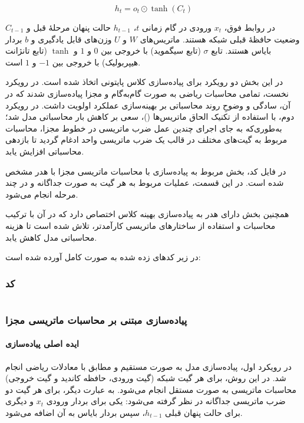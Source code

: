 \documentclass{article}
\begin{document}
\[
h_t = o_t \odot \tanh(C_t)
\]

در روابط فوق، $x_t$ ورودی در گام زمانی $t$، $h_{t-1}$ حالت پنهان مرحلۀ قبل و $C_{t-1}$ وضعیت حافظۀ قبلی شبکه هستند. ماتریس‌های $W$ و $U$ وزن‌های قابل یادگیری و $b$ بردار بایاس هستند. تابع $\sigma$ (تابع سیگموید) با خروجی بین $0$ و $1$ و $\tanh$ (تابع تانژانت هیپربولیک) با خروجی بین $-1$ و $1$ است.

در این بخش دو رویکرد برای پیاده‌سازی کلاس پایتونی اتخاذ شده است. در رویکرد نخست، تمامی محاسبات ریاضی به صورت گام‌به‌گام و مجزا پیاده‌سازی شدند که در آن، سادگی و وضوحِ روند محاسباتی بر بهینه‌سازی عملکرد اولویت داشت. در رویکرد دوم، با استفاده از تکنیک الحاق ماتریس‌ها ()، سعی بر کاهش بار محاسباتی مدل شد؛ به‌طوری‌که به جای اجرای چندین عمل ضرب ماتریسی در خطوط مجزا، محاسبات مربوط به گیت‌های مختلف در قالب یک ضرب ماتریسی واحد ادغام گردید تا بازدهی محاسباتی افزایش یابد. 

در فایل کد، بخش مربوط به پیاده‌سازی با محاسبات ماتریسی مجزا با هدر 
مشخص شده است. در این قسمت، عملیات مربوط به هر گیت به صورت جداگانه و در چند مرحله انجام می‌شود.

همچنین بخش دارای هدر 
به پیاده‌سازی بهینه کلاس اختصاص دارد که در آن با ترکیب محاسبات و استفاده از ساختارهای ماتریسی کارآمدتر، تلاش شده است تا هزینه محاسباتی مدل کاهش یابد.


در زیر کدهای زده شده به صورت کامل آورده شده است:
\subsubsection{کد}
\begin{LTR}
	\inputminted{python}{code/ML-Hw3-Q3.py}
\end{LTR}
\subsubsection{پیاده‌سازی مبتنی بر محاسبات ماتریسی مجزا}

\paragraph{ایده اصلی پیاده‌سازی}
در رویکرد اول، پیاده‌سازی مدل  به صورت مستقیم و مطابق با معادلات ریاضی انجام شد. در این روش، برای هر گیت شبکه (گیت ورودی، حافظه کاندید و گیت خروجی) محاسبات ماتریسی به صورت مستقل انجام می‌شود. به عبارت دیگر، برای هر گیت دو ضرب ماتریسی جداگانه در نظر گرفته می‌شود: یکی برای بردار ورودی $x_t$ و دیگری برای حالت پنهان قبلی $h_{t-1}$، سپس بردار بایاس به آن اضافه می‌شود.  
\end{document}
